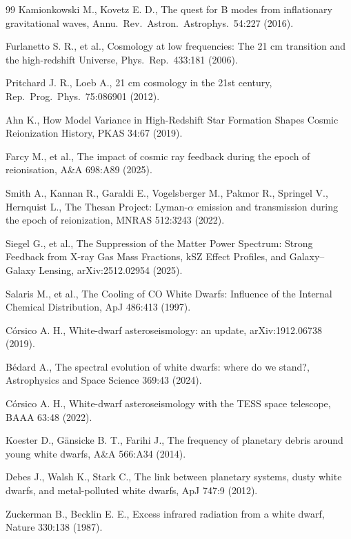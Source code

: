 \begin{thebibliography}{99}
Kamionkowski M., Kovetz E. D., The quest for B modes from inflationary gravitational waves, Annu.\ Rev.\ Astron.\ Astrophys.\ 54:227 (2016).

Furlanetto S. R., et al., Cosmology at low frequencies: The 21 cm transition and the high-redshift Universe, Phys.\ Rep.\ 433:181 (2006).

Pritchard J. R., Loeb A., 21 cm cosmology in the 21st century, Rep.\ Prog.\ Phys.\ 75:086901 (2012).

Ahn K., How Model Variance in High-Redshift Star Formation Shapes Cosmic Reionization History, PKAS 34:67 (2019).

Farcy M., et al., The impact of cosmic ray feedback during the epoch of reionisation, A\&A 698:A89 (2025).

Smith A., Kannan R., Garaldi E., Vogelsberger M., Pakmor R., Springel V., Hernquist L., The Thesan Project: Lyman-$\alpha$ emission and transmission during the epoch of reionization, MNRAS 512:3243 (2022).

Siegel G., et al., The Suppression of the Matter Power Spectrum: Strong Feedback from X-ray Gas Mass Fractions, kSZ Effect Profiles, and Galaxy--Galaxy Lensing, arXiv:2512.02954 (2025).

Salaris M., et al., The Cooling of CO White Dwarfs: Influence of the Internal Chemical Distribution, ApJ 486:413 (1997).

C\'orsico A. H., White-dwarf asteroseismology: an update, arXiv:1912.06738 (2019).

B\'edard A., The spectral evolution of white dwarfs: where do we stand?, Astrophysics and Space Science 369:43 (2024).

C\'orsico A. H., White-dwarf asteroseismology with the TESS space telescope, BAAA 63:48 (2022).

Koester D., G\"ansicke B. T., Farihi J., The frequency of planetary debris around young white dwarfs, A\&A 566:A34 (2014).

Debes J., Walsh K., Stark C., The link between planetary systems, dusty white dwarfs, and metal-polluted white dwarfs, ApJ 747:9 (2012).

Zuckerman B., Becklin E. E., Excess infrared radiation from a white dwarf, Nature 330:138 (1987).


\end{thebibliography}
